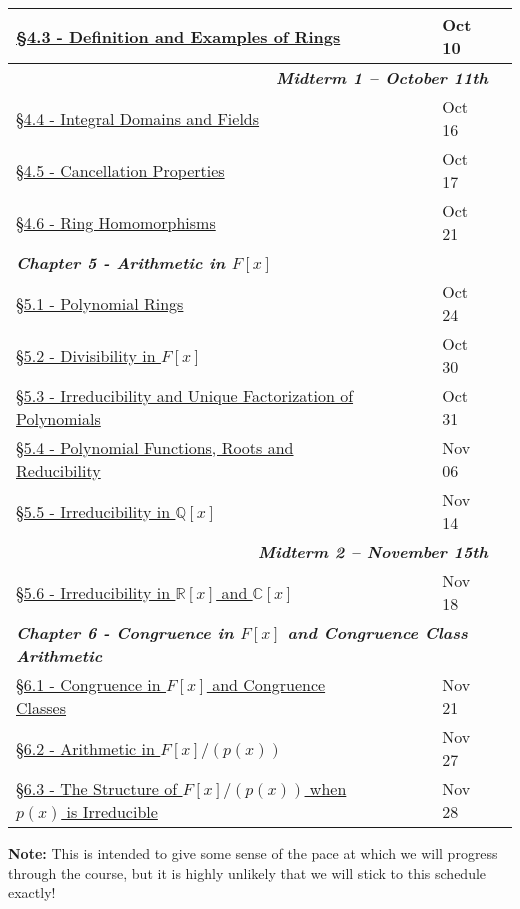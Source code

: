 \documentclass{article}
\newcommand{\chaptercolor}{RoyalBlue!35}
\newcommand{\testcolor}{Bittersweet!25}
\begin{document}
\begin{center}
\begin{tabular}{|l|l|l|l|l|l|}
\href{}{\S4.3 - Definition and Examples of Rings} & & & & Oct 10\\
\hline
\multicolumn{5}{|r|}{\cellcolor{\testcolor} \textit{\textbf{Midterm 1 -- October 11th}}}\\
\hline
\href{}{\S4.4 - Integral Domains and Fields} & & & & Oct 16\\
\href{}{\S4.5 - Cancellation Properties} & & & & Oct 17\\
\href{}{\S4.6 - Ring Homomorphisms} & & & & Oct 21\\
\hline
\multicolumn{5}{|l|}{\cellcolor{\chaptercolor} \textit{\textbf{Chapter 5 - Arithmetic in $F[x]$}}}\\
\hline
\href{}{\S5.1 - Polynomial Rings} & & & & Oct 24\\
\href{}{\S5.2 - Divisibility in $F[x]$} & & & & Oct 30\\
\href{}{\S5.3 - Irreducibility and Unique Factorization of Polynomials} & & & & Oct 31\\
\href{}{\S5.4 - Polynomial Functions, Roots and Reducibility} & & & & Nov 06\\
\href{}{\S5.5 - Irreducibility in $\mathbb{Q}[x]$} & & & & Nov 14\\
\hline
\multicolumn{5}{|r|}{\cellcolor{\testcolor} \textit{\textbf{Midterm 2 -- November 15th}}}\\
\hline
\href{}{\S5.6 - Irreducibility in $\mathbb{R}[x]$ and $\mathbb{C}[x]$} & & & & Nov 18\\
\hline
\multicolumn{5}{|l|}{\cellcolor{\chaptercolor} \textit{\textbf{Chapter 6 - Congruence in $F[x]$ and Congruence Class Arithmetic}}}\\
\hline
\href{}{\S6.1 - Congruence in $F[x]$ and Congruence Classes} & & & & Nov 21\\
\href{}{\S6.2 - Arithmetic in $F[x]/(p(x))$} & & & & Nov 27\\
\href{}{\S6.3 - The Structure of $F[x]/(p(x))$ when $p(x)$ is Irreducible} & & & & Nov 28\\
\hline
\end{tabular}
\end{center}
\noindent \textbf{Note:} This is intended to give some sense of the pace at which we will progress through the course, but it is highly unlikely that we will stick to this schedule exactly!
\end{document}
